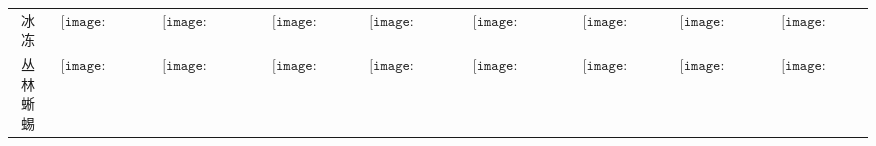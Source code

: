 \begin{longtable}{|c|cccccccc|}
冰冻&$\begin{array}{c}\texttt{[image: figures/Frozen\_Candle.png]}\end{array}$&$\begin{array}{c}\texttt{[image: figures/Frozen\_Candelabra.png]}\end{array}$&$\begin{array}{c}\texttt{[image: figures/Frozen\_Lamp.png]}\end{array}$&$\begin{array}{c}\texttt{[image: figures/Frozen\_Lantern.png]}\end{array}$&$\begin{array}{c}\texttt{[image: figures/Frozen\_Chandelier.png]}\end{array}$&$\begin{array}{c}\texttt{[image: figures/Frozen\_Door.png]}\end{array}$&$\begin{array}{c}\texttt{[image: figures/Frozen\_Toilet.png]}\end{array}$&$\begin{array}{c}\texttt{[image: figures/Ice\_Chest.png]}\end{array}$\\
丛林蜥蜴&$\begin{array}{c}\texttt{[image: figures/Lihzahrd\_Candle.png]}\end{array}$&$\begin{array}{c}\texttt{[image: figures/Lihzahrd\_Candelabra.png]}\end{array}$&$\begin{array}{c}\texttt{[image: figures/Lihzahrd\_Lamp.png]}\end{array}$&$\begin{array}{c}\texttt{[image: figures/Lihzahrd\_Lantern.png]}\end{array}$&$\begin{array}{c}\texttt{[image: figures/Lihzahrd\_Chandelier.png]}\end{array}$&$\begin{array}{c}\texttt{[image: figures/Lihzahrd\_Door.png]}\end{array}$&$\begin{array}{c}\texttt{[image: figures/Lihzahrd\_Toilet.png]}\end{array}$&$\begin{array}{c}\texttt{[image: figures/Lihzahrd\_Chest.png]}\end{array}$\\

\end{longtable}
